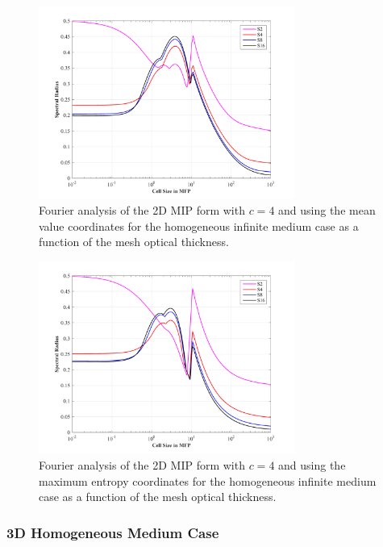 \begin{figure}
\centering
\includegraphics[width=0.75\textwidth]{figures/sec_DSA/SI_MIP_quad_C=4_MV1_LS2,4,8,16.png}
\caption{Fourier analysis of the 2D MIP form with $c=4$ and using the mean value coordinates for the homogeneous infinite medium case as a function of the mesh optical thickness.}
\label{fig::DSA_1G_Fourier_MV1}
\end{figure}

\begin{figure}
\centering
\includegraphics[width=0.75\textwidth]{figures/sec_DSA/SI_MIP_quad_C=4_MAXENT1_LS2,4,8,16.png}
\caption{Fourier analysis of the 2D MIP form with $c=4$ and using the maximum entropy coordinates for the homogeneous infinite medium case as a function of the mesh optical thickness.}
\label{fig::DSA_1G_Fourier_ME1}
\end{figure}

\subsubsection{3D Homogeneous Medium Case}
\label{sec::DSA_Results_1G_3DHomo}

